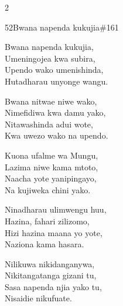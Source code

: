\begin{multicols}{2}
\begin{hymn}{52}{Bwana napenda kukujia}{\#161}
\begin{stanza}
Bwana napenda kukujia,\\
Umeningojea kwa subira,\\
Upendo wako umenishinda,\\
Hutadharau unyonge wangu.
\end{stanza}
\begin{chorus}
Bwana nitwae niwe wako,\\
Nimefidiwa kwa damu yako,\\
Nitawashinda adui wote,\\
Kwa uwezo wako na upendo.
\end{chorus}
\begin{stanza}
Kuona ufalme wa Mungu,\\
Lazima niwe kama mtoto,\\
Naacha yote yanipingayo,\\
Na kujiweka chini yako.
\end{stanza}
\begin{stanza}
Ninadharau ulimwengu huu,\\
Hazina, fahari zilizomo,\\
Hizi hazina maana yo yote,\\
Naziona kama hasara.
\end{stanza}
\begin{stanza}
Nilikuwa nikidanganywa,\\
Nikitangatanga gizani tu,\\
Sasa napenda njia yako tu,\\
Nisaidie nikufuate.
\end{stanza}
\end{hymn}


\end{multicols}
